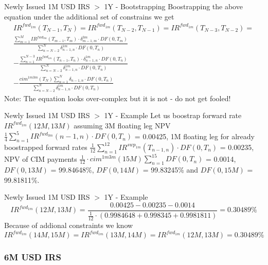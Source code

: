 \documentclass{beamer}
\begin{document}
\begin{frame}{Newly Issued 1M USD IRS $>$ 1Y - Bootstrapping}
Boostrapping the above equation under the additional set of constrains we get
\begin{multline*}
IR^{fwd_{1m}}(T_{N-1}, T_N) = IR^{fwd_{1m}}(T_{N - 2}, T_{N - 1}) = IR^{fwd_{1m}}(T_{N - 3}, T_{N - 2}) =\\
\frac{\sum_{m = 1}^M IR^{fwd_{3m}}(T_{m - 1}, T_m) \cdot \delta_{m - 1, m}^{3m} \cdot DF(0, T_m)}{\sum_{n = N - 2}^N \delta_{n - 1, n}^{1m} \cdot DF(0, T_n)}\\
- \frac{\sum_{n = 1}^{N - 3} IR^{fwd_{1m}}(T_{n - 1}, T_n) \cdot \delta_{n - 1, n}^{1m} \cdot DF(0, T_n)}{\sum_{n = N - 2}^N \delta_{n - 1, n}^{1m} \cdot DF(0, T_n)}\\
- \frac{cim^{1m3m}(T_N) \sum_{n = 1}^{N} \delta_{n - 1, n} \cdot DF(0, T_n)}{\sum_{n = N - 2}^N \delta_{n - 1, n}^{1m} \cdot DF(0, T_n)}
\end{multline*}
Note: The equation looks over-complex but it is not - do not get fooled!
\end{frame}

\begin{frame}{Newly Issued 1M USD IRS $>$ 1Y - Example}
Let us boostrap forward rate $IR^{fwd_{1m}}(12M, 13M)$ assuming 3M floating leg NPV $\frac{1}{4} \sum_{n = 1}^5 IR^{fwd_{3m}}(n - 1, n) \cdot DF(0, T_n)$ = 0.00425, 1M floating leg for already boostrapped forward rates $\frac{1}{12} \sum_{n = 1}^{12}IR^{swp_{1m}}(T_{n - 1, n}) \cdot DF(0, T_n)$ = 0.00235, NPV of CIM payments $\frac{1}{12} \cdot cim^{1m3m}(15M)\sum_{n = 1}^{15} DF(0, T_n)$ = 0.0014, $DF(0, 13M)$ = 99.84648\%, $DF(0, 14M)$ = 99.83245\% and $DF(0, 15M)$ = 99.81811\%.
\end{frame}

\begin{frame}{Newly Issued 1M USD IRS $>$ 1Y - Example}
\begin{equation*}
IR^{fwd_{1m}}(12M, 13M) = \frac{0.00425 - 0.00235 - 0.0014}{\frac{1}{12} \cdot (0.9984648 + 0.998345 + 0.9981811)} = 0.30489\%
\end{equation*}
Because of addional constraints we know
\begin{equation*}
IR^{fwd_{1m}}(14M, 15M) = IR^{fwd_{1m}}(13M, 14M) = IR^{fwd_{1m}}(12M, 13M) = 0.30489\%
\end{equation*}
\end{frame}

\subsubsection{6M USD IRS}
\end{document}
